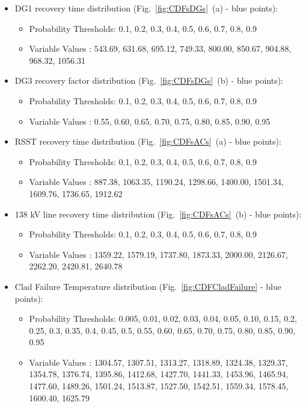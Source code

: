    \begin{itemize}
       \item DG1 recovery time distribution (Fig.~\ref{fig:CDFsDGs}~(a) - blue points): 
       \begin{itemize} 
            \item Probability Thresholds: 0.1, 0.2, 0.3, 0.4, 0.5, 0.6, 0.7, 0.8,  0.9
            \item Variable Values           : 543.69, 631.68, 695.12, 749.33, 800.00, 850.67, 904.88, 968.32, 1056.31
       \end{itemize}
       \item DG3 recovery factor distribution (Fig.~\ref{fig:CDFsDGs}~(b) - blue points): 
       \begin{itemize} 
            \item Probability Thresholds: 0.1, 0.2, 0.3, 0.4, 0.5, 0.6, 0.7, 0.8,  0.9
            \item Variable Values           : 0.55, 0.60, 0.65, 0.70, 0.75, 0.80, 0.85, 0.90, 0.95
       \end{itemize}
       \item RSST recovery time distribution (Fig.~\ref{fig:CDFsACs}~(a) - blue points): 
       \begin{itemize} 
            \item Probability Thresholds:  0.1, 0.2,  0.3,  0.4, 0.5, 0.6, 0.7,  0.8,  0.9
            \item Variable Values           :  887.38, 1063.35, 1190.24, 1298.66, 1400.00, 1501.34, 1609.76, 1736.65, 1912.62
       \end{itemize}
       \item 138 kV line recovery time distribution (Fig.~\ref{fig:CDFsACs}~(b) - blue points): 
       \begin{itemize} 
            \item Probability Thresholds: 0.1, 0.2, 0.3, 0.4, 0.5, 0.6, 0.7, 0.8, 0.9 
            \item Variable Values           : 1359.22,  1579.19,  1737.80, 1873.33,  2000.00,  2126.67, 2262.20,  2420.81, 2640.78
       \end{itemize}
       \item Clad Failure Temperature distribution (Fig.~\ref{fig:CDFCladFailure} - blue points): 
       \begin{itemize} 
            \item Probability Thresholds: 0.005, 0.01, 0.02, 0.03, 0.04, 0.05, 0.10, 0.15, 0.2, 0.25, 0.3, 0.35, 0.4, 0.45, 0.5, 0.55, 0.60, 0.65, 0.70, 0.75, 0.80, 0.85, 0.90, 0.95
            \item Variable Values           : 1304.57, 1307.51, 1313.27, 1318.89, 1324.38, 1329.37, 1354.78, 1376.74, 1395.86, 1412.68, 1427.70, 1441.33, 1453.96, 1465.94, 1477.60, 1489.26, 1501.24, 1513.87, 1527.50, 	1542.51, 1559.34, 1578.45, 1600.40, 1625.79
    \end{itemize}
\end{itemize}
\vspace{-5mm}

